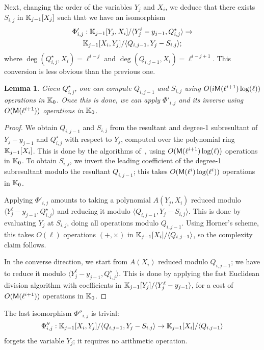 \documentclass{sig-alternate}
\newtheorem{lemma}[definition]{Lemma}
\begin{document}
Next, changing the order of the variables $Y_j$ and $X_i$, we deduce
that there exists $S_{i,j}$ in $\mathbb{K}_{j-1}[X_j]$ such that we have an
isomorphism
\begin{multline*}
\Phi'_{i,j}: \mathbb{K}_{j-1}[Y_j,X_i]/\langle Y_j^\ell-y_{j-1}, Q^\star_{i,j}\rangle
\to\\ \mathbb{K}_{j-1}[X_i, Y_j]/\langle Q_{i,j-1}, Y_j-S_{i,j}\rangle;
\end{multline*}
where $\deg(Q^\star_{i,j},X_i)=\ell^{i-j}$ and
$\deg(Q_{i,j-1},X_i)=\ell^{i-j+1}$. This conversion is less obvious
than the previous one.
\begin{lemma}
  Given $Q^\star_{i,j}$, one can compute $Q_{i,j-1}$ and $S_{i,j}$
  using $O(i\mathsf{M}(\ell^{i+1})\log(\ell))$ operations in $\mathbb{K}_0$.
  Once this is done, we can apply $\Phi'_{i,j}$ and its inverse 
  using $O(\mathsf{M}(\ell^{i+1}))$ operations in $\mathbb{K}_0$.
\end{lemma}
\begin{proof}
  We obtain $Q_{i,j-1}$ and $S_{i,j}$ from the resultant and degree-1
  subresultant of $Y_j-y_{j-1}$ and $Q^\star_{i,j}$ with respect to
  $Y_j$, computed over the polynomial ring $\mathbb{K}_{j-1}[X_i]$. This is
  done by the algorithms of~\cite{Reischert97,LiRo01}, using
  $O(\mathsf{M}(\ell^{i+1})\log(\ell))$ operations in $\mathbb{K}_0$. To obtain
  $S_{i,j}$, we invert the leading coefficient of the degree-1
  subresultant modulo the resultant $Q_{i,j-1}$; this takes
  $O(\mathsf{M}(\ell^{i})\log(\ell^i))$ operations in $\mathbb{K}_0$.

  Applying $\Phi'_{i,j}$ amounts to taking a polynomial $A(Y_j,X_i)$ 
  reduced modulo $\langle Y_j^\ell-y_{j-1}, Q^\star_{i,j}\rangle$
  and reducing it modulo $\langle Q_{i,j-1}, Y_j-S_{i,j}\rangle$. This
  is done by evaluating $Y_j$ at $S_{i,j}$, doing all operations
  modulo $Q_{i,j-1}$. Using Horner's scheme, this takes $O(\ell)$ 
  operations $(+,\times)$ in $\mathbb{K}_{j-1}[X_i]/\langle Q_{i,j-1}\rangle$,
  so the complexity claim follows.

  In the converse direction, we start from $A(X_i)$ reduced modulo
  $Q_{i,j-1}$; we have to reduce it modulo $\langle Y_j^\ell-y_{j-1},
  Q^\star_{i,j}\rangle$. This is done by applying the fast Euclidean
  division algorithm with coefficients in $\mathbb{K}_{j-1}[Y_j]/\langle
  Y_j^\ell-y_{j-1}\rangle$, for a cost of $O(\mathsf{M}(\ell^{i+1}))$
  operations in $\mathbb{K}_0$.
\end{proof}

The last isomorphism $\Phi''_{i,j}$ is trivial:
$$\Phi''_{i,j}: \mathbb{K}_{j-1}[X_i, Y_j]/\langle Q_{i,j-1}, Y_j-S_{i,j}\rangle
\to \mathbb{K}_{j-1}[X_i]/\langle Q_{i,j-1}\rangle$$
forgets the variable $Y_j$; it requires no arithmetic operation.
\end{document}
